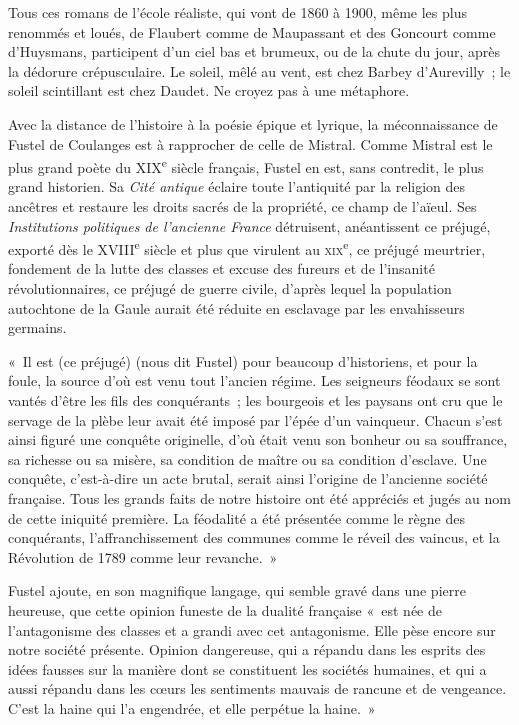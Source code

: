 \documentclass[french,twoside]{book} %
\begin{document}
Tous ces romans de l’école réaliste, qui vont de 1860 à 1900, même les plus renommés et loués, de Flaubert comme de Maupassant et des Goncourt comme d’Huysmans, participent d’un ciel bas et brumeux, ou de la chute du jour, après la dédorure crépusculaire. Le soleil, mêlé au vent, est chez Barbey d’Aurevilly ; le soleil scintillant est chez Daudet. Ne croyez pas à une métaphore.\par
Avec la distance de l’histoire à la poésie épique et lyrique, la méconnaissance de Fustel de Coulanges est à rapprocher de celle de Mistral. Comme Mistral est le plus grand poète du XIX\textsuperscript{e} siècle français, Fustel en est, sans contredit, le plus grand historien. Sa {\itshape Cité antique} éclaire toute l’antiquité par la religion des ancêtres et restaure les droits sacrés de la propriété, ce champ de l’aïeul. Ses {\itshape Institutions politiques de l’ancienne France} détruisent, anéantissent ce préjugé, exporté dès le XVIII\textsuperscript{e} siècle et plus que virulent au \textsc{xix}\textsuperscript{e}, ce préjugé meurtrier, fondement de la lutte des classes et excuse des fureurs et de l’insanité révolutionnaires, ce préjugé de guerre civile, d’après lequel la population autochtone de la Gaule aurait été réduite en esclavage par les envahisseurs germains.\par
« Il est (ce préjugé) (nous dit Fustel) pour beaucoup d’historiens, et pour la foule, la source d’où est venu tout l’ancien régime. Les seigneurs féodaux se sont vantés d’être les fils des conquérants ; les bourgeois et les paysans ont cru que le servage de la plèbe leur avait été imposé par l’épée d’un vainqueur. Chacun s’est ainsi figuré une conquête originelle, d’où était venu son bonheur ou sa souffrance, sa richesse ou sa misère, sa condition de maître ou sa condition d’esclave. Une conquête, c’est-à-dire un acte brutal, serait ainsi l’origine de l’ancienne société française. Tous les grands faits de notre histoire ont été appréciés et jugés au nom de cette iniquité première. La féodalité a été présentée comme le règne des conquérants, l’affranchissement des communes comme le réveil des vaincus, et la Révolution de 1789 comme leur revanche. »\par
Fustel ajoute, en son magnifique langage, qui semble gravé dans une pierre heureuse, que cette opinion funeste de la dualité française « est née de l’antagonisme des classes et a grandi avec cet antagonisme. Elle pèse encore sur notre société présente. Opinion dangereuse, qui a répandu dans les esprits des idées fausses sur la manière dont se constituent les sociétés humaines, et qui a aussi répandu dans les cœurs les sentiments mauvais de rancune et de vengeance. C’est la haine qui l’a engendrée, et elle perpétue la haine. »\par
\end{document}
